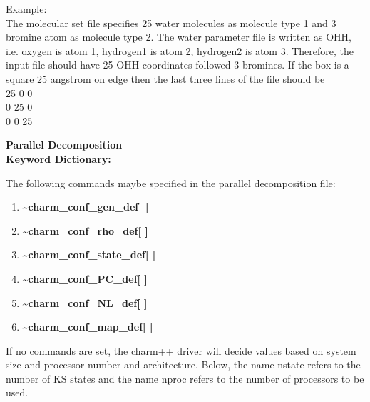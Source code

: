 \documentclass[12pt]{article}
\begin{document}
Example: \\ 
The molecular set file specifies 25 water molecules as molecule
type 1 and 3 bromine atom as molecule type 2. The water parameter file is 
written as OHH, i.e. oxygen is atom 1, hydrogen1 is atom 2, hydrogen2 is 
atom 3. Therefore, the input file should have 25 OHH coordinates followed
3 bromines. If the box is a square 25 angstrom on edge 
then the last three lines of the file should be \\
\hspace*{1.5in}  25  0  0  \\
\hspace*{1.5in}  0  25  0  \\
\hspace*{1.5in}  0  0   25 \\

\clearpage
\begin{center}
\huge
{\bf Parallel Decomposition \\ Keyword Dictionary: } 
\end{center}
\large

The following commands maybe specified in the parallel decomposition file:
\begin{enumerate}
\LARGE
\item {\bf \~{ }charm\_conf\_gen\_def[ ]}
\item {\bf \~{ }charm\_conf\_rho\_def[ ]}
\item {\bf \~{ }charm\_conf\_state\_def[ ]}
\item {\bf \~{ }charm\_conf\_PC\_def[ ]}
\item {\bf \~{ }charm\_conf\_NL\_def[ ]}
\item {\bf \~{ }charm\_conf\_map\_def[ ]}
\end{enumerate}
If no commands are set, the charm++ driver will decide values based
on system size and processor number and architecture. Below, the 
name nstate refers to the number of KS states and the name nproc
refers to the number of processors to be used.
\end{document}
